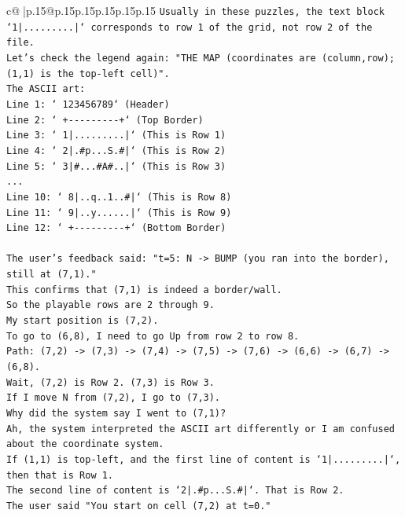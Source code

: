 \documentclass{article}
\begin{document}
{\begin{supertabular}{c@{$\;$}|p{.15\linewidth}@{}p{.15\linewidth}p{.15\linewidth}p{.15\linewidth}p{.15\linewidth}p{.15\linewidth}}
{{{\texttt{Usually in these puzzles, the text block `1|.........|` corresponds to row 1 of the grid, not row 2 of the file.} \\
\texttt{Let's check the legend again: "THE MAP (coordinates are (column,row); (1,1) is the top{-}left cell)".} \\
\texttt{The ASCII art:} \\
\texttt{Line 1: ` 123456789` (Header)} \\
\texttt{Line 2: `  +{-}{-}{-}{-}{-}{-}{-}{-}{-}+` (Top Border)} \\
\texttt{Line 3: ` 1|.........|` (This is Row 1)} \\
\texttt{Line 4: ` 2|.\#p...S.\#|` (This is Row 2)} \\
\texttt{Line 5: ` 3|\#...\#A\#..|` (This is Row 3)} \\
\texttt{...} \\
\texttt{Line 10: ` 8|..q..1..\#|` (This is Row 8)} \\
\texttt{Line 11: ` 9|..y......|` (This is Row 9)} \\
\texttt{Line 12: `  +{-}{-}{-}{-}{-}{-}{-}{-}{-}+` (Bottom Border)} \\
\\ 
\texttt{The user's feedback said: "t=5: N {-}> BUMP (you ran into the border), still at (7,1)."} \\
\texttt{This confirms that (7,1) is indeed a border/wall.} \\
\texttt{So the playable rows are 2 through 9.} \\
\texttt{My start position is (7,2).} \\
\texttt{To go to (6,8), I need to go Up from row 2 to row 8.} \\
\texttt{Path: (7,2) {-}> (7,3) {-}> (7,4) {-}> (7,5) {-}> (7,6) {-}> (6,6) {-}> (6,7) {-}> (6,8).} \\
\texttt{Wait, (7,2) is Row 2. (7,3) is Row 3.} \\
\texttt{If I move N from (7,2), I go to (7,3).} \\
\texttt{Why did the system say I went to (7,1)?} \\
\texttt{Ah, the system interpreted the ASCII art differently or I am confused about the coordinate system.} \\
\texttt{If (1,1) is top{-}left, and the first line of content is `1|.........|`, then that is Row 1.} \\
\texttt{The second line of content is `2|.\#p...S.\#|`. That is Row 2.} \\
\texttt{The user said "You start on cell (7,2) at t=0."} \\
}}}
\end{supertabular}}
\end{document}
